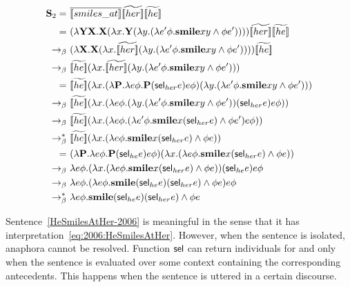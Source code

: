 \begin{example} \label{ex:2006:HeSmilesAtHer} 
\begin{align}
\S_2 = \ & \tr{\I{smiles\_at}} \etr{\I{her}} \etr{\I{he}} \notag \\
 = \ & (\lambda \Y2 \X2. \X2( \lambda \x1. \Y2 (\lambda \y1. ( \lambda e' \phi. \textbf{smile} \x1 \y1 \land \phi e' ))) )  \etr{\I{her}} \etr{\I{he}} \notag \\
\bconv \ & (\lambda  \X2. \X2( \lambda \x1.  \etr{\I{her}}  (\lambda \y1. ( \lambda e' \phi. \textbf{smile} \x1 \y1 \land \phi e' ))) ) \etr{\I{he}} \notag \\
\bconv \ &   \etr{\I{he}}  ( \lambda \x1.  \etr{\I{her}}  (\lambda \y1. ( \lambda e' \phi. \textbf{smile} \x1 \y1 \land \phi e' ))) \notag  \\
= \ &   \etr{\I{he}} ( \lambda \x1.  (\lambda \P2. \lambda e \phi. \P2 (\selK_{her}e)e\phi)  (\lambda \y1. ( \lambda e' \phi. \textbf{smile} \x1 \y1 \land \phi e' ))) \notag \\
 \bconv \ &  \etr{\I{he}}  ( \lambda \x1.  (\lambda e \phi.  (\lambda \y1. ( \lambda e' \phi. \textbf{smile} \x1 \y1 \land \phi e' )) (\selK_{her}e)e\phi) ) \notag \\
  \bconv \ &  \etr{\I{he}}  ( \lambda \x1.  (\lambda e \phi.   ( \lambda e' \phi. \textbf{smile} \x1  (\selK_{her}e) \land \phi e' ) e\phi) ) \notag \\
 \bred \ &   \etr{\I{he}}  ( \lambda \x1.  (\lambda e \phi.  \textbf{smile} \x1  (\selK_{her}e) \land \phi e) ) \notag \\
  = \ &  (\lambda \P2. \lambda e \phi. \P2 (\selK_{he}e)e\phi) ( \lambda \x1.  (\lambda e \phi.  \textbf{smile} \x1  (\selK_{her}e) \land \phi e) ) \notag \\
\bconv \ & \lambda e \phi. ( \lambda \x1.  (\lambda e \phi.  \textbf{smile} \x1  (\selK_{her}e) \land \phi e) )  (\selK_{he}e)e\phi \notag \\
\bconv \ & \lambda e \phi.   (\lambda e \phi.  \textbf{smile}  (\selK_{he}e)  (\selK_{her}e) \land \phi e) e\phi \notag \\
\bred \ & \lambda e \phi.   \textbf{smile}  (\selK_{he}e)  (\selK_{her}e) \land \phi e \label{eq:2006:HeSmilesAtHer}
\end{align} \qex
\end{example}


Sentence~\eqref{HeSmilesAtHer-2006} is meaningful in the sense that it has interpretation~\eqref{eq:2006:HeSmilesAtHer}. However, when the sentence is isolated, anaphora cannot be resolved. Function $\mathsf{sel}$ can return individuals for  and  only when the sentence is evaluated over some context containing the corresponding antecedents. This happens when the sentence is uttered in a certain discourse. 

